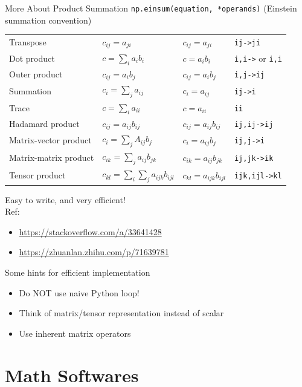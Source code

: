 \documentclass{../TexTemplate/myslide}
\begin{document}
\begin{frame}[fragile]{More About Product Summation}
\verb'np.einsum(equation, *operands)' (Einstein summation convention)
\small
\begin{center}
\begin{tabular}{llll}\hline\hline
Transpose & $c_{ij}=a_{ji}$ & $c_{ij}=a_{ji}$ & \verb'ij->ji'\\
Dot product & $c=\sum_i a_ib_i$ & $c=a_ib_i$ & \verb'i,i->' or \verb'i,i'\\
Outer product & $c_{ij}=a_ib_j$ & $c_{ij}=a_ib_j$ & \verb'i,j->ij'\\
Summation & $c_i=\sum_j a_{ij}$ & $c_i=a_{ij}$ & \verb'ij->i'\\
Trace & $c=\sum_i a_{ii}$ & $c=a_{ii}$ & \verb'ii'\\
Hadamard product & $c_{ij}=a_{ij}b_{ij}$ & $c_{ij}=a_{ij}b_{ij}$ & \verb'ij,ij->ij'\\
Matrix-vector product & $c_i=\sum_jA_{ij}b_j$ & $c_i=a_{ij}b_j$ & \verb'ij,j->i'\\
Matrix-matrix product & $c_{ik}=\sum_ja_{ij}b_{jk}$ & $c_{ik}=a_{ij}b_{jk}$ & \verb'ij,jk->ik'\\
Tensor product & $c_{kl}=\sum_i\sum_ja_{ijk}b_{ijl}$ & $c_{kl}=a_{ijk}b_{ijl}$ & \verb'ijk,ijl->kl'\\
\hline
\end{tabular}
\end{center}
Easy to write, and very efficient!\\
Ref:
\begin{itemize}
	\item \url{https://stackoverflow.com/a/33641428}
	\item \url{https://zhuanlan.zhihu.com/p/71639781}
\end{itemize}
\end{frame}

\begin{frame}{Some hints for efficient implementation}
\begin{itemize}
	\item Do NOT use naive Python loop!
	\item Think of matrix/tensor representation instead of scalar
	\item Use inherent matrix operators
\end{itemize}
\end{frame}

\section{Math Softwares}
\begin{frame}
\sectionpage
\end{frame}
\end{document}
